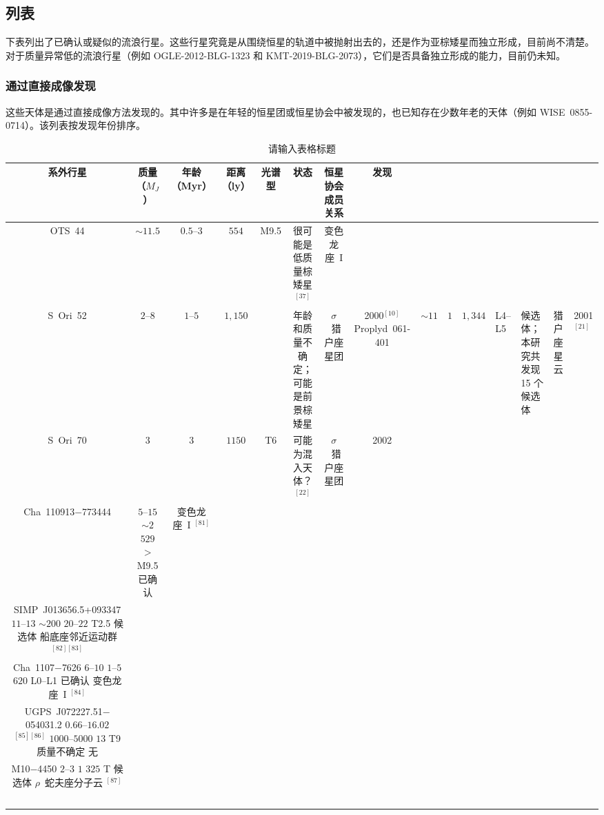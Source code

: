 \subsection{列表}
下表列出了已确认或疑似的流浪行星。这些行星究竟是从围绕恒星的轨道中被抛射出去的，还是作为亚棕矮星而独立形成，目前尚不清楚。对于质量异常低的流浪行星（例如 OGLE-2012-BLG-1323 和 KMT-2019-BLG-2073），它们是否具备独立形成的能力，目前仍未知。
\subsubsection{通过直接成像发现}
这些天体是通过直接成像方法发现的。其中许多是在年轻的恒星团或恒星协会中被发现的，也已知存在少数年老的天体（例如 WISE~0855-0714）。该列表按发现年份排序。

\begin{table}[ht]
\centering
\caption{请输入表格标题}\label{tab_RoPl1}
\begin{tabular}{|c|c|c|c|c|c|c|c|}
\hline
系外行星 & 质量（$M_J$）& 年龄（Myr）& 距离（ly）& 光谱型 & 状态 & 恒星协会成员关系 & 发现\\
\hline
OTS~44 & $\sim11.5$ & $0.5$--$3$ & $554$ & M9.5 & 很可能是低质量棕矮星$^{[37]}$ & 变色龙座~I \\
\hline
S~Ori~52 & $2$--$8$ & $1$--$5$ & $1{,}150$  &  & 年龄和质量不确定；可能是前景棕矮星 & $\sigma$~猎户座星团 & 2000$^{[10]}$
\hline
Proplyd~061-401 & $\sim11$ & $1$ & $1{,}344$ & L4--L5 & 候选体；本研究共发现 15 个候选体 & 猎户座星云 & 2001$^{[21]}$\\
\hline
S~Ori~70 & $3$ & $3$ & $1150$ & T6 & 可能为混入天体？$^{[22]}$ & $\sigma$~猎户座星团 & 2002\\
\hline
Cha~110913$-$773444 & $5$--$15$ \quad $\sim2$ \quad $529$ \quad $>$M9.5 \quad 已确认 & 变色龙座~I $^{[81]}$\\
\hline
SIMP~J013656.5+093347 \quad $11$--$13$ \quad $\sim200$ \quad $20$--$22$ \quad T2.5 \quad 候选体 \quad 船底座邻近运动群 $^{[82][83]}$\\
\hline
Cha~1107$-$7626 \quad $6$--$10$ \quad $1$--$5$ \quad $620$ \quad L0--L1 \quad 已确认 \quad 变色龙座~I $^{[84]}$\\
\hline
UGPS~J072227.51$-$054031.2 \quad $0.66$--$16.02$$^{[85][86]}$ \quad $1000$--$5000$ \quad $13$ \quad T9 \quad 质量不确定 \quad 无 \\
\hline
M10$-$4450 \quad $2$--$3$ \quad $1$ \quad $325$ \quad T \quad 候选体 \quad $\rho$~蛇夫座分子云 $^{[87]}$\\
$$
\end{tabular}
\end{table}
